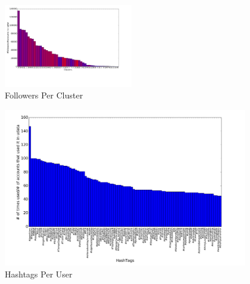 \documentclass{sig-alternate-05-2015}
\begin{document}
\begin{figure}[h!]
	\caption{Followers Per Cluster}
	\centering
		\includegraphics[width=0.5\textwidth]{imgs/followers}
\end{figure}

\begin{figure}
	\caption{Hashtags Per User}
	\centering
		\includegraphics[width=0.95\textwidth]{imgs/bhvc}
\end{figure}

\end{document}
